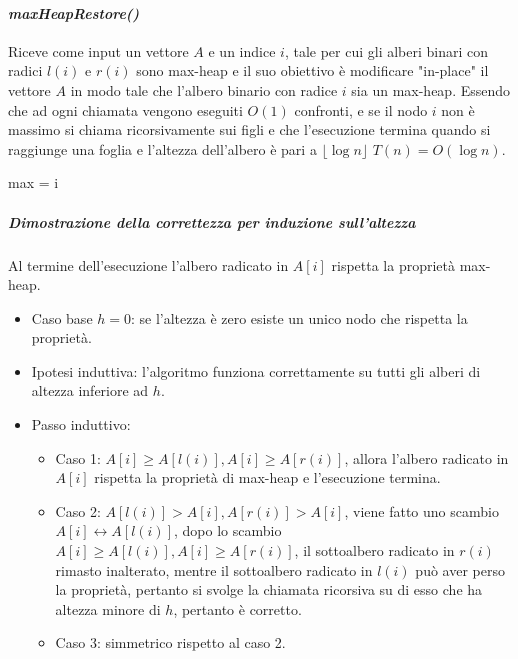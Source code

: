 \paragraph{\emph{maxHeapRestore()}}
Riceve come input un vettore $A$ e un indice $i$, tale per cui gli alberi binari con radici $l(i)$ e $r(i)$ sono max-heap e il suo obiettivo \`e modificare
"in-place" il vettore $A$ in modo tale che l'albero binario con radice $i$ sia un max-heap. Essendo che ad ogni chiamata vengono eseguiti $O(1)$ confronti, 
e se il nodo $i$ non \`e massimo si chiama ricorsivamente sui figli e che l'esecuzione termina quando si raggiunge una foglia e l'altezza dell'albero \`e
pari a $\lfloor \log n\rfloor$ $T(n)=O(\log n)$.
\begin{algorithm}
\DontPrintSemicolon
{}
\caption{\protect{}}

\Int max = i\;
\end{algorithm}
\subparagraph{Dimostrazione della correttezza per induzione sull'altezza}
Al termine dell'esecuzione l'albero radicato in $A[i]$ rispetta la propriet\`a max-heap.
\begin{itemize}
\item Caso base $h=0$: se l'altezza \`e zero esiste un unico nodo che rispetta la propriet\`a.
\item Ipotesi induttiva: l'algoritmo funziona correttamente su tutti gli alberi di altezza inferiore ad $h$.
\item Passo induttivo:
\begin{itemize}
\item Caso 1: $A[i]\ge A[l(i)], A[i]\ge A[r(i)]$, allora l'albero radicato in $A[i]$ rispetta la propriet\`a di max-heap e l'esecuzione termina.
\item Caso 2: $A[l(i)] > A[i], A[r(i)]> A[i]$, viene fatto uno scambio $A[i]\leftrightarrow A[l(i)]$, dopo lo scambio $A[i]\ge A[l(i)], A[i]\ge A[r(i)]$, 
il sottoalbero radicato in $r(i)$ rimasto inalterato,  mentre il sottoalbero radicato in $l(i)$ pu\`o aver perso la propriet\`a, pertanto si svolge la 
chiamata ricorsiva su di esso che ha altezza minore di $h$, pertanto \`e corretto.
\item Caso 3: simmetrico rispetto al caso 2.
\end{itemize}
\end{itemize}
